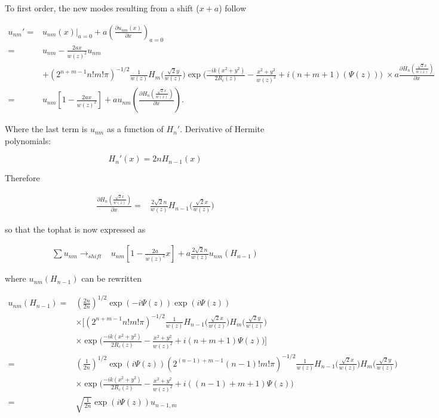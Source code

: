 \documentclass[aps,twoside,secnumarabic,balancelastpage,amsmath,amssymb,nofootinbib,hyperref=pdftex]{revtex4}
\begin{document}
 To first order, the new modes resulting from a shift ($x+a$) follow

\begin{align*}
	u_{nm}' =& u_{nm}(x)|_{a=0} + a (\frac{\partial u_{nm}(x)}{\partial x})_{a=0}
	\\=&
		u_{nm} 
		-
		\frac{2ax}{w(z)^2} 
		u_{nm}
		\\&+
		(2^{n+m-1}n!m!\pi)^{-1/2}
		\frac{1}{w(z)}
		H_{m} \Big(\frac{\sqrt{2}y}{w(z)} \Big)
		\exp \Big(\frac{-ik(x^{2}+y^{2})}{2R_{c}(z)}-
		\frac{x^{2}+y^{2}}{w(z)^{2}} 
		+i(n+m+1)(\Psi(z))		
		\Big)\;
		\times
		a 		
		\frac{\partial H_n(\frac{\sqrt{2}x }{w(z)})}{\partial x}
			\\=&
		u_{nm}
		[
		1
		-
		\frac{2ax}{w(z)^2}]		
		+
		a 	
		u_{nm}(	
		\frac{\partial H_n(\frac{\sqrt{2}x }{w(z)})}{\partial x}
		)
		.
\end{align*}

Where the last term is $u_{nm}$ as a function of $H_n'$. Derivative of Hermite polynomials:


\begin{equation*}
	H_n'(x) = 2n H_{n-1} (x)
\end{equation*}

Therefore

\begin{align*}
	\frac{\partial H_n(\frac{\sqrt{2}x }{w(z)})}{\partial x}
	=&
	\frac{2 \sqrt{2} n}{w(z)} H_{n-1}\Big(\frac{\sqrt{2}x}{w(z)}\Big)
\end{align*}

so that the tophat is now expressed as

\begin{align*}
	\sum u_{nm} \rightarrow_{shift}&    
     u_{nm}
        \left[
        1 - \frac{2 a }{w(z)^2} x 
    \right]
    + 
	a \frac{2 \sqrt{2} n}{w(z)} 
	u_{nm}(H_{n-1})
\end{align*}

where $u_{nm} (H_{n-1})$ can be rewritten

\begin{align*}
	u_{nm} (H_{n-1}) =&
	(\frac{2 n }{2 n})^{1/2}
			\exp(-i \Psi(z))\exp(i \Psi(z))
			\\& \times
	[
	(2^{n+m-1}n!m!\pi)^{-1/2}
		\frac{1}{w(z)}
		H_{n-1} \Big(\frac{\sqrt{2}x}{w(z)} \Big)
		H_{m} \Big(\frac{\sqrt{2}y}{w(z)} \Big)
	\\& \times		
		\exp \Big(\frac{-ik(x^{2}+y^{2})}{2R_{c}(z)}-
		\frac{x^{2}+y^{2}}{w(z)^{2}} 
		+i(n+m+1)\Psi(z)		
		\Big)
				]
		\\=&
		(\frac{1}{2 n}) ^{1/2}
		\exp(i \Psi(z))
			(2^{(n-1)+m-1}(n-1)!m!\pi)^{-1/2}
		\frac{1}{w(z)}
		H_{n-1} \Big(\frac{\sqrt{2}x}{w(z)} \Big)
		H_{m} \Big(\frac{\sqrt{2}y}{w(z)} \Big)
			\\& \times	
		\exp \Big(\frac{-ik(x^{2}+y^{2})}{2R_{c}(z)}-
		\frac{x^{2}+y^{2}}{w(z)^{2}} 
		+i( (n-1)+m+1)\Psi(z)			
		\Big)
		\\=&
		\sqrt{\frac{1}{2 n}}
		\exp(i \Psi(z))
		u_{n-1,m}
\end{align*}
\end{document}
